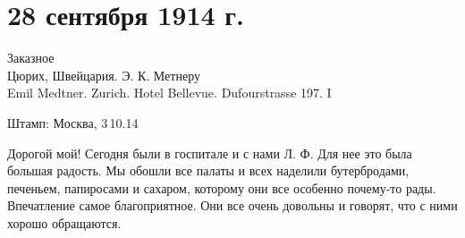 \section{28 сентября 1914 г.}


Заказное \\
Цюрих, Швейцария.
Э. К. Метнеру \\
Emil Medtner.
Zurich.
Hotel Bellevue.
Dufourstrasse 197. I

Штамп: Москва, 3\,10.14


Дорогой мой! Сегодня были в госпитале и с нами Л. Ф. Для нее это была большая
радость. Мы обошли все палаты и всех наделили бутербродами, печеньем,
папиросами и сахаром, которому они все особенно почему-то рады. Впечатление
самое благоприятное. Они все очень довольны и говорят, что с ними хорошо
обращаются.
